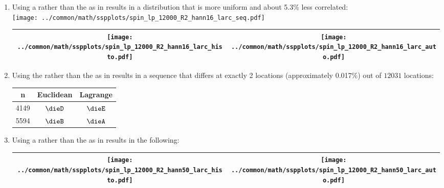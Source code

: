 \begin{example}
\begin{enumerate}
  \item \label{item:spin_lp_R2_hann16_larc}
        Using a  rather than the 
         as in 
        results in a distribution that is more uniform and about 5.3\% less correlated:
        \\\texttt{[image: ../common/math/sspplots/spin\_lp\_12000\_R2\_hann16\_larc\_seq.pdf]}
     \\\begin{tabular}{|>{\scs}c|>{\scs}c|}
          \hline
          \texttt{[image: ../common/math/sspplots/spin\_lp\_12000\_R2\_hann16\_larc\_histo.pdf]}%
         &\texttt{[image: ../common/math/sspplots/spin\_lp\_12000\_R2\_hann16\_larc\_auto.pdf]}
        \\\hline
     \end{tabular}

  \item \begin{minipage}[t]{\tw-70mm}%
          Using the  rather than the  as in 
          results in a sequence that differs at exactly 2 locations (approximately 0.017\%) 
          out of $12031$ locations:\footnotemark
        \end{minipage}%
        \hfill{} %
          \begin{tabstr}{0.75}\begin{tabular}[t]{|c|c|c|}
            \hline
              n   & Euclidean & Lagrange
            \\\hline
               4149 & $\dieD$   & $\dieE$
            \\ 5594 & $\dieB$   & $\dieA$
            \\\hline
          \end{tabular}\end{tabstr}%

  \item \label{item:spin_lp_R2_hann50_larc}
        Using a  rather than the 
         as in 
        results in the following:%
     \\\begin{tabular}{|>{\scs}c|>{\scs}c|}
          \hline
          \texttt{[image: ../common/math/sspplots/spin\_lp\_12000\_R2\_hann50\_larc\_histo.pdf]}%
         &\texttt{[image: ../common/math/sspplots/spin\_lp\_12000\_R2\_hann50\_larc\_auto.pdf]}
        \\\hline
     \end{tabular}


\end{enumerate}
\end{example}
